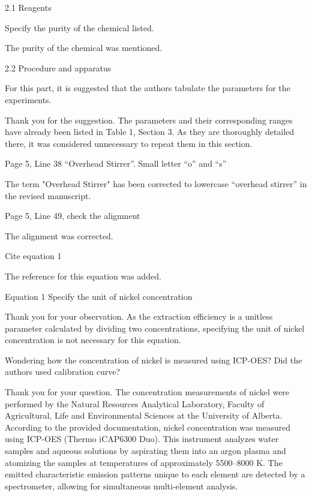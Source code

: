 \documentclass[11pt,answers]{exam}
\begin{document}
\begin{questions}
2.1 Reagents

\question Specify the purity of the chemical listed.
\begin{solutionorbox}
    The purity of the chemical was mentioned.
\end{solutionorbox}
2.2 Procedure and apparatus

\question For this part, it is suggested that the authors tabulate the parameters for the experiments.
\begin{solutionorbox}
    Thank you for the suggestion. The parameters and their corresponding ranges have already been listed in Table 1, Section 3. As they are thoroughly detailed there, it was considered unnecessary to repeat them in this section.
\end{solutionorbox}

\question Page 5, Line 38 “Overhead Stirrer”. Small letter “o” and “s”
\begin{solutionorbox}
    The term "Overhead Stirrer" has been corrected to lowercase “overhead stirrer” in the revised manuscript.
\end{solutionorbox}

\question Page 5, Line 49, check the alignment

\begin{solutionorbox}
The alignment was corrected.
\end{solutionorbox}

\question Cite equation 1

\begin{solutionorbox}
The reference for this equation was added.
\end{solutionorbox}


\question Equation 1 Specify the unit of nickel concentration
\begin{solutionorbox}
Thank you for your observation. As the extraction efficiency is a unitless parameter calculated by dividing two concentrations, specifying the unit of nickel concentration is not necessary for this equation.
\end{solutionorbox}

\question Wondering how the concentration of nickel is measured using ICP-OES? Did the authors used calibration curve?

\begin{solutionorbox}
Thank you for your question. The concentration measurements of nickel were performed by the Natural Resources Analytical Laboratory, Faculty of Agricultural, Life and Environmental Sciences at the University of Alberta. According to the provided documentation, nickel concentration was measured using ICP-OES (Thermo iCAP6300 Duo). This instrument analyzes water samples and aqueous solutions by aspirating them into an argon plasma and atomizing the samples at temperatures of approximately 5500–8000 K. The emitted characteristic emission patterns unique to each element are detected by a spectrometer, allowing for simultaneous multi-element analysis.


\end{solutionorbox}
\end{questions}
\end{document}
